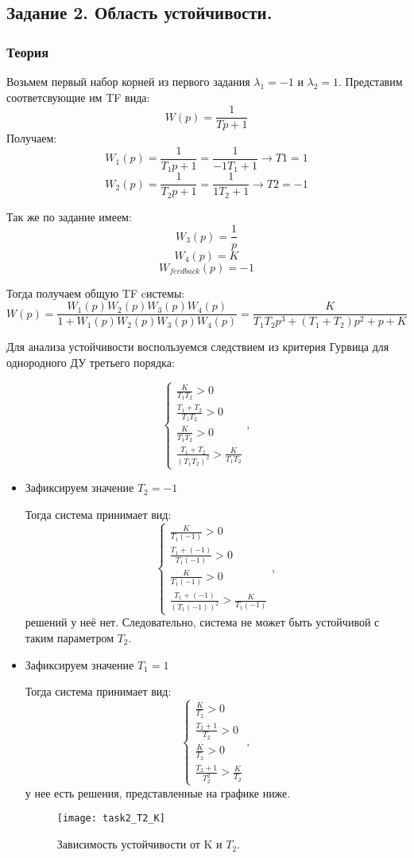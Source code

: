\documentclass[16pt]{article}
\begin{document}
\newpage
\subsection{Задание 2. Область устойчивости. }
\subsubsection{Теория}
Возьмем первый набор корней из первого задания \(\lambda_1 = -1\) и \(\lambda_2 = 1\).
Представим соответсвующие им TF вида:
\[W(p) = \frac{1}{Tp + 1}\]
Получаем:
\[W_1(p) = \frac{1}{T_1p + 1} = \frac{1}{-1T_1 + 1} \rightarrow T1 = 1\]
\[W_2(p) = \frac{1}{T_2p + 1} = \frac{1}{1T_2 + 1} \rightarrow T2 = -1\]

Так же по задание имеем:
\[W_3(p) = \frac{1}{p}\]
\[W_4(p) = K\]
\[W_{feedback}(p) = -1\]

Тогда получаем общую TF cистемы:
\[W(p) = \frac{W_1(p)W_2(p)W_3(p)W_4(p)}{1 + W_1(p)W_2(p)W_3(p)W_4(p)} = \frac{K}{T_1T_2p^3 + (T_1+T_2)p^2+p+K}\]

Для анализа устойчивости воспользуемся следствием из критерия Гурвица для однородного ДУ третьего порядка:

\[
    \begin{cases}
        \frac{K}{T_1T_2} > 0 \\
        \frac{T_1+T_2}{T_1T_2} > 0\\ 
        \frac{K}{T_1T_2} > 0\\ 
        \frac{T_1+T_2}{(T_1T_2)^2} > \frac{K}{T_1T_2}
    \end{cases},
\]

\begin{itemize}
    \item Зафиксируем значение \(T_2 = -1\)
    
    Тогда система принимает вид: 
    \[
    \begin{cases}
        \frac{K}{T_1(-1)} > 0 \\
        \frac{T_1+(-1)}{T_1(-1)} > 0\\ 
        \frac{K}{T_1(-1)} > 0\\ 
        \frac{T_1+(-1)}{(T_1(-1))^2} > \frac{K}{T_1(-1)}
    \end{cases},
    \]
    решений у неё нет. Следовательно, система не может быть устойчивой с таким параметром \(T_2\).

    \item Зафиксируем значение \(T_1 = 1\)
    
    Тогда система принимает вид: 
    \[
    \begin{cases}
        \frac{K}{T_2} > 0 \\
        \frac{T_2+1}{T_2} > 0\\ 
        \frac{K}{T_2} > 0\\ 
        \frac{T_2+1}{T_2^2} > \frac{K}{T_2}
    \end{cases},
    \]
    у нее есть решения, представленные на графике ниже.
    \begin{figure}[H]
        \centering
        \texttt{[image: task2\_T2\_K]}
        \caption{Зависимость устойчивости от K и \(T_2\).}
        \label{fig:fig4}
    \end{figure}
\end{itemize}
\newpage
\end{document}
